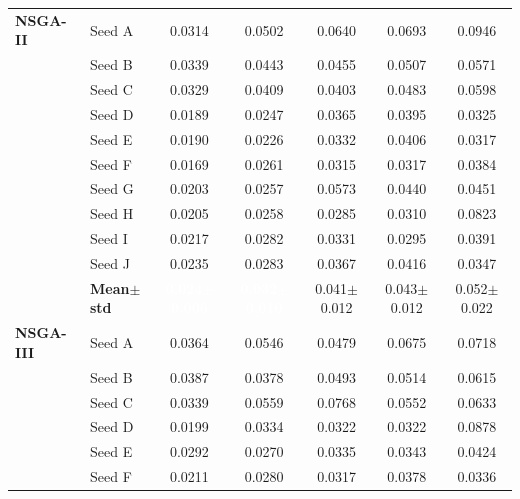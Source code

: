 \begin{table}[H]
{\begin{tabular}{@{}llccccc@{}}
\midrule
 \textbf{NSGA-II} & Seed A & {\small 0.0314} & {\small 0.0502} & {\small 0.0640} & {\small 0.0693} & {\small 0.0946} \\
  & Seed B & {\small 0.0339} & {\small 0.0443} & {\small 0.0455} & {\small 0.0507} & {\small 0.0571} \\
  & Seed C & {\small 0.0329} & {\small 0.0409} & {\small 0.0403} & {\small 0.0483} & {\small 0.0598} \\
  & Seed D & {\small 0.0189} & {\small 0.0247} & {\small 0.0365} & {\small 0.0395} & {\small 0.0325} \\
  & Seed E & {\small 0.0190} & {\small 0.0226} & {\small 0.0332} & {\small 0.0406} & {\small 0.0317} \\
  & Seed F & {\small 0.0169} & {\small 0.0261} & {\small 0.0315} & {\small 0.0317} & {\small 0.0384} \\
  & Seed G & {\small 0.0203} & {\small 0.0257} & {\small 0.0573} & {\small 0.0440} & {\small 0.0451} \\
  & Seed H & {\small 0.0205} & {\small 0.0258} & {\small 0.0285} & {\small 0.0310} & {\small 0.0823} \\
  & Seed I & {\small 0.0217} & {\small 0.0282} & {\small 0.0331} & {\small 0.0295} & {\small 0.0391} \\
  & Seed J & {\small 0.0235} & {\small 0.0283} & {\small 0.0367} & {\small 0.0416} & {\small 0.0347} \\
 & \textbf{Mean$\pm$std} & \cellcolor{ForestGreen!55}\textcolor{white}{\textbf{0.024$\pm$0.006}} & \cellcolor{ForestGreen!55}\textcolor{white}{\textbf{0.032$\pm$0.010}} & \cellcolor{ForestGreen!25}0.041$\pm$0.012 & \cellcolor{ForestGreen!25}0.043$\pm$0.012 & \cellcolor{ForestGreen!25}0.052$\pm$0.022 \\
\midrule
 \textbf{NSGA-III} & Seed A & {\small 0.0364} & {\small 0.0546} & {\small 0.0479} & {\small 0.0675} & {\small 0.0718} \\
  & Seed B & {\small 0.0387} & {\small 0.0378} & {\small 0.0493} & {\small 0.0514} & {\small 0.0615} \\
  & Seed C & {\small 0.0339} & {\small 0.0559} & {\small 0.0768} & {\small 0.0552} & {\small 0.0633} \\
  & Seed D & {\small 0.0199} & {\small 0.0334} & {\small 0.0322} & {\small 0.0322} & {\small 0.0878} \\
  & Seed E & {\small 0.0292} & {\small 0.0270} & {\small 0.0335} & {\small 0.0343} & {\small 0.0424} \\
  & Seed F & {\small 0.0211} & {\small 0.0280} & {\small 0.0317} & {\small 0.0378} & {\small 0.0336} \\

\end{tabular}}
\end{table}
